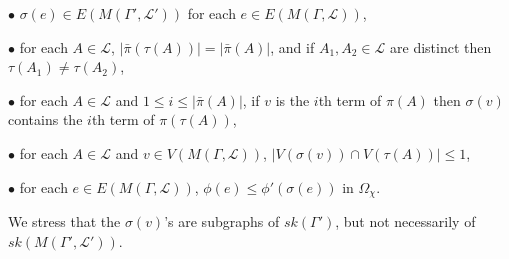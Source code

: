 \hspace*{12pt}$\bullet$ $\sigma(e) \in E(M(\Gamma', \mathscr{L}'))$ for each $e \in E(M(\Gamma, \mathscr{L}))$,

\hspace*{12pt}$\bullet$ for each $A \in \mathscr{L}$, $|\bar{\pi}(\tau(A))| = |\bar{\pi}(A)|$, and if $A_1, A_2 \in \mathscr{L}$ are distinct then $\tau(A_1) \ne \tau(A_2)$,

\hspace*{12pt}$\bullet$ for each $A \in \mathscr{L}$ and $1 \le i \le |\bar{\pi}(A)|$, if $v$ is the $i$th term of $\pi(A)$ then $\sigma(v)$ contains the $i$th term of $\pi(\tau(A))$,

\hspace*{12pt}$\bullet$ for each $A \in \mathscr{L}$ and $v \in V(M(\Gamma, \mathscr{L}))$, $|V(\sigma(v)) \cap V(\tau(A))| \le 1$,

\hspace*{12pt}$\bullet$ for each $e \in E(M(\Gamma, \mathscr{L}))$, $\phi(e) \le \phi'(\sigma(e))$ in $\Omega_{\chi}$.

We stress that the $\sigma(v)$'s are subgraphs of $sk(\Gamma')$, but not necessarily of $sk(M(\Gamma', \mathscr{L}'))$.
